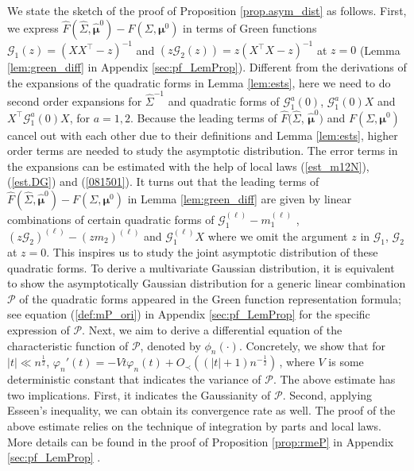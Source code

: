 \documentclass[12pt]{article}
\numberwithin{equation}{section}
\theoremstyle{remark}
\newcommand{\1}{{\rm 1}\kern-0.24em{\rm I}}
\begin{document}
We state the sketch of the proof of Proposition \ref{prop.asym_dist} as follows. First, we express $\widehat{F}(\widehat\Sigma, \hat{\bm{\mu}}^0)- F(\Sigma, {\bm{\mu}}^0)$ in terms of Green functions $\mathcal{G}_1(z)= (XX^\top -z)^{-1}$ and $(z\mathcal{G}_2(z))= z(X^\top X-z)^{-1}$ at $z=0$ (Lemma \ref{lem:green_diff} in Appendix \ref{sec:pf_LemProp}).  
 Different from the derivations of the expansions of the quadratic forms in Lemma \ref{lem:ests}, here we need to do second order expansions for  $\widehat{\Sigma}^{-1}$ and quadratic forms of $\mathcal{G}_1^a(0)$, $\mathcal{G}_1^a(0)X$ and $X^\top \mathcal{G}_1^a(0) X$, for $a=1,2$. Because the leading terms of $\widehat{F}(\widehat\Sigma$, $\hat{\bm{\mu}}^0)$ and $F(\Sigma, {\bm{\mu}}^0)$ cancel out with each other due to  their definitions and Lemma \ref{lem:ests}, higher order terms are needed to study the asymptotic distribution. The error terms in the expansions can be estimated with the help of local laws (\ref{est_m12N}), (\ref{est.DG}) and (\ref{081501}).  It turns out that the leading terms of $\widehat{F}(\widehat\Sigma, \hat{\bm{\mu}}^0)- F(\Sigma, {\bm{\mu}}^0)$ in Lemma \ref{lem:green_diff} are given by linear combinations of certain quadratic forms of  $\mathcal{G}_1^{(\ell)} - m_1^{(\ell)}$ , $(z\mathcal{G}_2)^{(\ell)} -(zm_2)^{(\ell)}$ and $\mathcal{G}_1^{(\ell)}X$ where we omit the argument $z$ in $\mathcal{G}_1$, $\mathcal{G}_2$ at $z=0$. This inspires us to study the joint asymptotic distribution of these quadratic forms. To derive a multivariate Gaussian distribution, it is equivalent to show  the asymptotically Gaussian distribution for a generic linear combination $\mathcal{P}$ of the quadratic forms appeared in the Green function representation formula; see equation (\ref{def:mP_ori}) in  Appendix \ref{sec:pf_LemProp} for the specific expression of $\mathcal{P}$. Next, we aim to derive a differential equation of the characteristic function of $\mathcal{P}$, denoted by $\phi_n(\cdot)$. Concretely, we show that for $|t|\ll n^{\frac 12}$, $\varphi_n'(t) = - V t \varphi_n(t)  + O_\prec((|t|+1) n^{-\frac 12})\,$,
where $V$ is some deterministic constant that indicates the variance of $\mathcal{P}$. The above estimate has two implications. First, it indicates the Gaussianity of $\mathcal{P}$. Second, applying Esseen's inequality, we can obtain its convergence rate as well. The proof of the above estimate relies on the technique of integration by parts and local laws. More details can be found in the proof of  Proposition  \ref{prop:rmeP} in Appendix \ref{sec:pf_LemProp} . 
\end{document}
